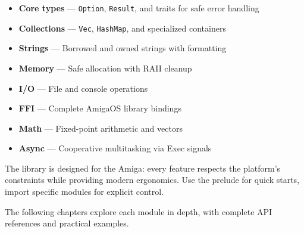\begin{itemize}
    \item \textbf{Core types} --- \texttt{Option}, \texttt{Result}, and traits for safe error handling
    \item \textbf{Collections} --- \texttt{Vec}, \texttt{HashMap}, and specialized containers
    \item \textbf{Strings} --- Borrowed and owned strings with formatting
    \item \textbf{Memory} --- Safe allocation with RAII cleanup
    \item \textbf{I/O} --- File and console operations
    \item \textbf{FFI} --- Complete AmigaOS library bindings
    \item \textbf{Math} --- Fixed-point arithmetic and vectors
    \item \textbf{Async} --- Cooperative multitasking via Exec signals
\end{itemize}

The library is designed for the Amiga: every feature respects the platform's constraints while providing modern ergonomics. Use the prelude for quick starts, import specific modules for explicit control.

The following chapters explore each module in depth, with complete API references and practical examples.
